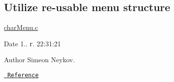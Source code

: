 \subsection*{Utilize re-\/usable menu structure}

\mbox{\hyperlink{char_menu_8c}{char\+Menu.\+c}}

\begin{DoxyDate}{Date}
1.. г. 22\+:31\+:21 
\end{DoxyDate}
\begin{DoxyAuthor}{Author}
Simeon Neykov.
\end{DoxyAuthor}
\href{https://www.youtube.com/watch?v=PFzNBtnfJ6Y&list=PLfGDzGG5F5eYNBkXs0tTdXqLB3KE5CFgx}{\texttt{ Reference}} 